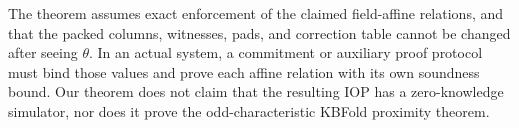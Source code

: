 \begin{remark}
The theorem assumes exact enforcement of
the claimed field-affine relations,
and that the packed columns, witnesses,
pads, and correction table cannot be
changed after seeing $\theta$.
In an actual system, a commitment or
auxiliary proof protocol must bind
those values and prove each affine
relation with its own soundness bound.
Our theorem does not claim that
the resulting IOP has a
zero-knowledge simulator, nor does it
prove the odd-characteristic
KBFold proximity theorem.
\end{remark}
